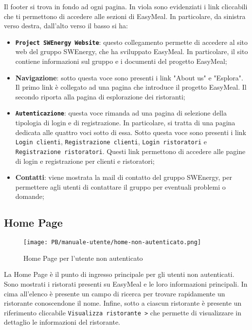 Il footer si trova in fondo ad ogni pagina. In viola sono evidenziati i link
cliccabili che ti permettono di accedere alle sezioni di EasyMeal. In
particolare, da sinistra verso destra, dall'alto verso il basso si ha:
\begin{itemize}
	\item \textbf{\texttt{Project SWEnergy Website}}: questo collegamento permette di
		accedere al sito web del gruppo SWEnergy, che ha sviluppato EasyMeal.
		In particolare, il sito contiene informazioni sul gruppo e i documenti
		del progetto EasyMeal;

	\item \textbf{Navigazione}: sotto questa voce sono presenti i link "About
		us" e "Esplora". Il primo link è collegato ad una pagina che introduce
		il progetto EasyMeal. Il secondo riporta alla pagina di esplorazione dei
		ristoranti;

	\item \textbf{\texttt{Autenticazione}}: questa voce rimanda ad una pagina di
		selezione della tipologia di login e di registrazione. In particolare,
		si tratta di una pagina dedicata alle quattro voci sotto di essa. Sotto
		questa voce sono presenti i link \texttt{Login clienti}, 
		\texttt{Registrazione clienti}, \texttt{Login ristoratori} e 
		\texttt{Registrazione ristoratori}. Questi
		link permettono di accedere alle pagine di login e registrazione per
		clienti e ristoratori;

	\item \textbf{Contatti}: viene mostrata la mail di contatto del gruppo
		SWEnergy, per permettere agli utenti di contattare il gruppo per
		eventuali problemi o domande;
\end{itemize}


\subsection{Home Page}

\begin{figure}[htbp]
    \centering
	\texttt{[image: PB/manuale-utente/home-non-autenticato.png]}
    \caption{Home Page per l'utente non autenticato}
\end{figure}

La Home Page è il punto di ingresso principale per gli utenti non autenticati. 
Sono mostrati i ristorati presenti su EasyMeal e le loro informazioni
principali. In cima all'elenco è presente un campo di ricerca per trovare
rapidamente un ristorante conoscendone il nome. Infine, sotto a ciascun
ristorante è presente un riferimento cliccabile \texttt{Visualizza ristorante >}
che permette di visualizzare in dettaglio le informazioni del ristorante.

